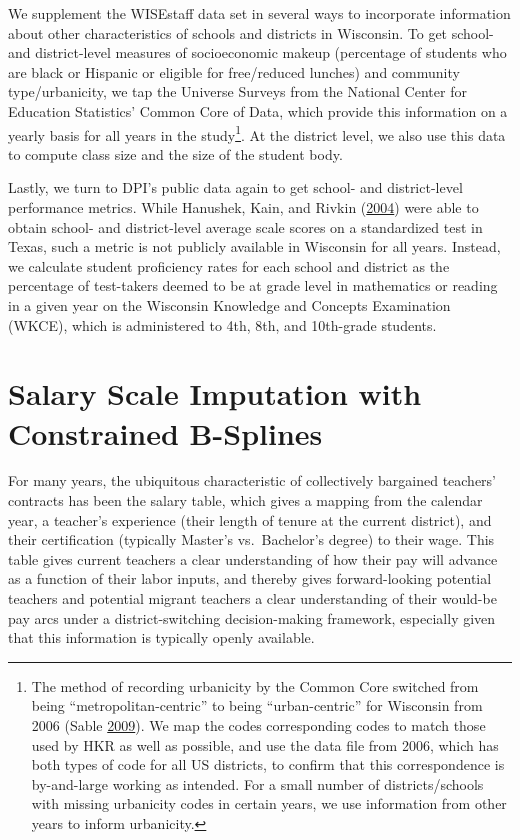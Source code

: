 \documentclass[12pt,]{article}
\let\rmarkdownfootnote\footnote%
\def\footnote{\protect\rmarkdownfootnote}
\begin{document}
We supplement the WISEstaff data set in several ways to incorporate
information about other characteristics of schools and districts in
Wisconsin. To get school- and district-level measures of socioeconomic
makeup (percentage of students who are black or Hispanic or eligible for
free/reduced lunches) and community type/urbanicity, we tap the Universe
Surveys from the National Center for Education Statistics' Common Core
of Data, which provide this information on a yearly basis for all years
in the study\footnote{The method of recording urbanicity by the Common
  Core switched from being ``metropolitan-centric'' to being
  ``urban-centric'' for Wisconsin from 2006 (Sable
  \protect\hyperlink{ref-sable}{2009}). We map the codes corresponding
  codes to match those used by HKR as well as possible, and use the data
  file from 2006, which has both types of code for all US districts, to
  confirm that this correspondence is by-and-large working as intended.
  For a small number of districts/schools with missing urbanicity codes
  in certain years, we use information from other years to inform
  urbanicity.}. At the district level, we also use this data to compute
class size and the size of the student body.

Lastly, we turn to DPI's public data again to get school- and
district-level performance metrics. While Hanushek, Kain, and Rivkin
(\protect\hyperlink{ref-hanushek}{2004}) were able to obtain school- and
district-level average scale scores on a standardized test in Texas,
such a metric is not publicly available in Wisconsin for all years.
Instead, we calculate student proficiency rates for each school and
district as the percentage of test-takers deemed to be at grade level in
mathematics or reading in a given year on the Wisconsin Knowledge and
Concepts Examination (WKCE), which is administered to 4th, 8th, and
10th-grade students.

\section{Salary Scale Imputation with Constrained
B-Splines}\label{salary-scale-imputation-with-constrained-b-splines}

For many years, the ubiquitous characteristic of collectively bargained
teachers' contracts has been the salary table, which gives a mapping
from the calendar year, a teacher's experience (their length of tenure
at the current district), and their certification (typically Master's
vs.~Bachelor's degree) to their wage. This table gives current teachers
a clear understanding of how their pay will advance as a function of
their labor inputs, and thereby gives forward-looking potential teachers
and potential migrant teachers a clear understanding of their would-be
pay arcs under a district-switching decision-making framework,
especially given that this information is typically openly available.
\end{document}
